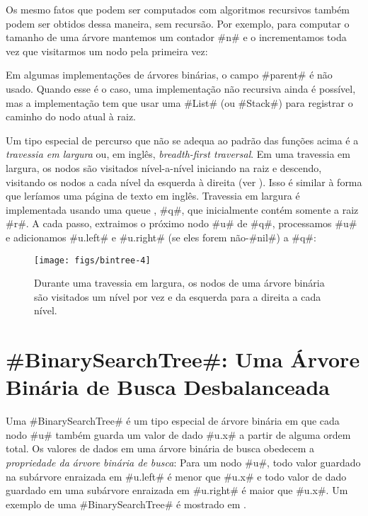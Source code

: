 Os mesmo fatos que podem ser computados com algoritmos recursivos também podem
ser obtidos dessa maneira, sem recursão. Por exemplo, para computar o tamanho 
de uma árvore mantemos um contador #n# e o incrementamos toda vez que visitarmos um nodo pela primeira vez:

Em algumas implementações de árvores binárias, o campo #parent# é não usado.
Quando esse é o caso, uma implementação não recursiva ainda é possível,
mas a implementação tem que usar uma 
#List# (ou #Stack#) para registrar o caminho do nodo atual à raiz.

Um tipo especial de percurso que não se adequa ao padrão das funções acima é a
\emph{travessia em largura} ou, em inglês, \emph{breadth-first traversal}.
%
%
Em uma travessia em largura, os nodos são visitados nível-a-nível iniciando na raiz e descendo, visitando os nodos a cada nível da esquerda à direita (ver
). Isso é similar à forma que leríamos uma página de texto em inglês. Travessia em largura é implementada usando uma queue 
, #q#, que inicialmente contém somente a raiz #r#. A cada passo, 
extraimos o próximo nodo #u# de #q#, processamos #u# e adicionamos #u.left#
e #u.right# (se eles forem não-#nil#) a #q#:

\begin{figure}
  \begin{center}
    \texttt{[image: figs/bintree-4]}
  \end{center}
  \caption{Durante uma travessia em largura, os nodos de uma árvore binária são visitados um nível por vez e da esquerda para a direita a cada nível.}
\end{figure}


\section{#BinarySearchTree#: Uma Árvore Binária de Busca Desbalanceada} 

%
%
%
Uma 
#BinarySearchTree# é um tipo especial de árvore binária em que cada nodo #u# também guarda um valor de dado #u.x# a partir de alguma ordem total.
Os valores de dados em uma árvore binária de busca obedecem a \emph{propriedade da árvore binária de busca}:
%
Para um nodo #u#, todo valor guardado na subárvore enraizada em #u.left#
é menor que #u.x# e todo valor de dado guardado em uma subárvore enraizada 
em #u.right# é maior que #u.x#. Um exemplo de uma
 #BinarySearchTree# é mostrado em .

